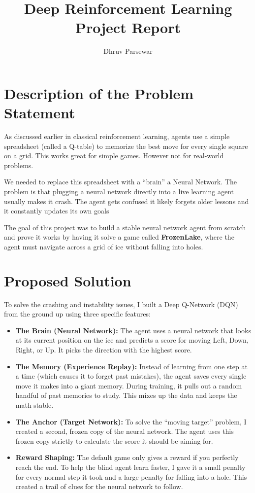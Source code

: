 \documentclass[12pt]{article}
\title{\textbf{Deep Reinforcement Learning Project Report}}
\author{Dhruv Parsewar}
\date{}
\begin{document}
\maketitle

\vspace{1cm}

\section{Description of the Problem Statement}
As discussed earlier in classical reinforcement learning, agents use a simple spreadsheet (called a Q-table) to memorize the best move for every single square on a grid. This works great for simple games. However not for real-world problems.

We needed to replace this spreadsheet with a ``brain'' a Neural Network. The problem is that plugging a neural network directly into a live learning agent usually makes it crash. The agent gets confused it likely forgets older lessons and it constantly updates its own goals

The goal of this project was to build a stable neural network agent from scratch and prove it works by having it solve a game called \textbf{FrozenLake}, where the agent must navigate across a grid of ice without falling into holes.

\section{Proposed Solution}
To solve the crashing and instability issues, I built a Deep Q-Network (DQN) from the ground up using three specific features:

\begin{itemize}[label=$\bullet$]
    \item \textbf{The Brain (Neural Network):} The agent uses a neural network that looks at its current position on the ice and predicts a score for moving Left, Down, Right, or Up. It picks the direction with the highest score.
    \item \textbf{The Memory (Experience Replay):} Instead of learning from one step at a time (which causes it to forget past mistakes), the agent saves every single move it makes into a giant memory. During training, it pulls out a random handful of past memories to study. This mixes up the data and keeps the math stable.
    \item \textbf{The Anchor (Target Network):} To solve the ``moving target'' problem, I created a second, frozen copy of the neural network. The agent uses this frozen copy strictly to calculate the score it should be aiming for. 
    \item \textbf{Reward Shaping:} The default game only gives a reward if you perfectly reach the end. To help the blind agent learn faster, I gave it a small penalty for every normal step it took and a large penalty for falling into a hole. This created a trail of clues for the neural network to follow.
\end{itemize}
\end{document}
